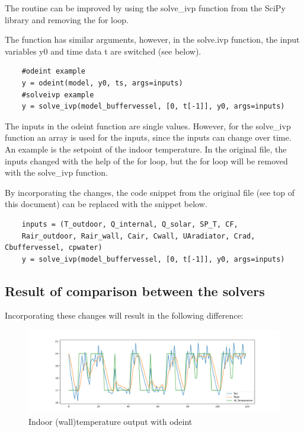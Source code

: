 The routine can be improved by using the \textsf{solve\_ivp} function from the \textsf{SciPy} library and removing the \textsf{for} loop.

The function has similar arguments, however, in the \textsf{solve.ivp} function, the input variables \textsf{y0} and time data \textsf{t} are switched (see below).


\begin{lstlisting}
	#odeint example
	y = odeint(model, y0, ts, args=inputs)
	#solveivp example
	y = solve_ivp(model_buffervessel, [0, t[-1]], y0, args=inputs)
\end{lstlisting}

The inputs in the \textsf{odeint} function are single values. However, for the \textsf{solve\_ivp} function an array is used for the inputs, since the inputs can change over time. An example is the setpoint of the indoor temperature. In the original file, the inputs changed with the help of the for loop, but the for loop will be removed with the \textsf{solve\_ivp} function.

By incorporating the changes, the code snippet from the original file (see top of this document) can be replaced with the snippet below.

\begin{lstlisting}
	inputs = (T_outdoor, Q_internal, Q_solar, SP_T, CF,
	Rair_outdoor, Rair_wall, Cair, Cwall, UAradiator, Crad, Cbuffervessel, cpwater)
	y = solve_ivp(model_buffervessel, [0, t[-1]], y0, args=inputs)
\end{lstlisting}

\subsection{Result of comparison between the solvers}

Incorporating these changes will result in the following difference:

\begin{figure}[ht]
	\centering
	\includegraphics[width=1\columnwidth]{Figures/odeint_with_for_loop.png}
	\caption[Short title]{Indoor (wall)temperature output with \textsf{odeint}}
	\label{fig:profilelabels}
\end{figure}

